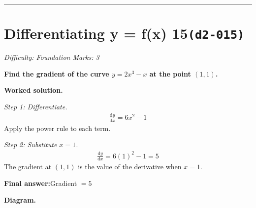 \documentclass[11pt]{article}
\newcommand{\question}[1]{\par\medskip\noindent\textbf{#1}\par}
\begin{document}
\medskip\hrule

\section*{Differentiating y = f(x) 15\quad\small\texttt{(d2-015)}}
\textit{Difficulty: Foundation \quad\textbar\quad Marks: 3}

\question{Find the gradient of the curve \( y = 2x^3 - x \) at the point \( (1, 1) \).}

\textbf{Worked solution.}

\textit{Step 1: Differentiate.}
\[\begin{gathered}
\frac{\mathrm{d}y}{\mathrm{d}x} = 6x^2 - 1
\end{gathered}\]
Apply the power rule to each term.

\textit{Step 2: Substitute \( x = 1 \).}
\[\begin{gathered}
\frac{\mathrm{d}y}{\mathrm{d}x} = 6(1)^2 - 1 = 5
\end{gathered}\]
The gradient at \( (1,1) \) is the value of the derivative when \( x = 1 \).

\begin{answerbox}
\textbf{Final answer:}\quad Gradient \(\displaystyle  = 5 \)
\end{answerbox}
\textbf{Diagram.}
\end{document}
